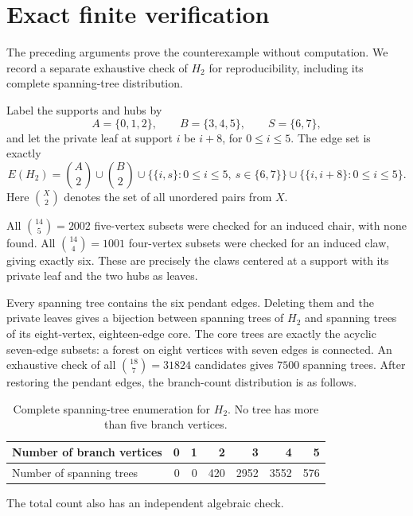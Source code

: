 \documentclass[11pt]{article}
\theoremstyle{remark}
\begin{document}
\section{Exact finite verification}

The preceding arguments prove the counterexample without computation. We record a separate exhaustive check of $H_2$ for reproducibility, including its complete spanning-tree distribution.

Label the supports and hubs by
\[
 A=\{0,1,2\},\qquad B=\{3,4,5\},\qquad S=\{6,7\},
\]
and let the private leaf at support $i$ be $i+8$, for $0\leq i\leq5$. The edge set is exactly
\begin{equation}\label{eq:labelededges}
 E(H_2)=\binom A2\cup\binom B2
 \cup\bigl\{\{i,s\}:0\leq i\leq5,\ s\in\{6,7\}\bigr\}
 \cup\bigl\{\{i,i+8\}:0\leq i\leq5\bigr\}.
\end{equation}
Here $\binom X2$ denotes the set of all unordered pairs from $X$.

All $\binom{14}{5}=2002$ five-vertex subsets were checked for an induced chair, with none found. All $\binom{14}{4}=1001$ four-vertex subsets were checked for an induced claw, giving exactly six. These are precisely the claws centered at a support with its private leaf and the two hubs as leaves.

Every spanning tree contains the six pendant edges. Deleting them and the private leaves gives a bijection between spanning trees of $H_2$ and spanning trees of its eight-vertex, eighteen-edge core. The core trees are exactly the acyclic seven-edge subsets: a forest on eight vertices with seven edges is connected. An exhaustive check of all $\binom{18}{7}=31824$ candidates gives $7500$ spanning trees. After restoring the pendant edges, the branch-count distribution is as follows.

\begin{table}[htbp]
\centering
\begin{tabular}{@{}lrrrrrr@{}}
\toprule
Number of branch vertices & 0 & 1 & 2 & 3 & 4 & 5\\
\midrule
Number of spanning trees & 0 & 0 & 420 & 2952 & 3552 & 576\\
\bottomrule
\end{tabular}
\caption{Complete spanning-tree enumeration for $H_2$. No tree has more than five branch vertices.}
\label{tab:trees}
\end{table}

The total count also has an independent algebraic check.
\end{document}

